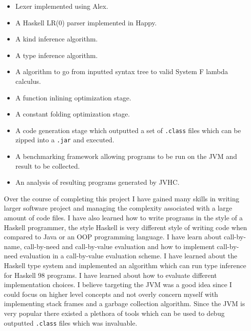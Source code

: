 \documentclass[float=false, crop=false]{standalone}
\begin{document}
\begin{itemize}

  \item Lexer implemented using Alex.

  \item A Haskell LR(0) parser implemented in Happy.

  \item A kind inference algorithm.

  \item A type inference algorithm.

  \item A algorithm to go from inputted syntax tree to valid
    System F lambda calculus.

  \item A function inlining optimization stage.

  \item A constant folding optimization stage.

  \item A code generation stage which outputted a set of \verb|.class|
    files which can be zipped into a \verb|.jar| and executed.

  \item A benchmarking framework allowing programs to be run on the JVM and 
    result to be collected.

  \item An analysis of resulting programs generated by JVHC.
\end{itemize}
Over the course of completing this project I have gained many
skills in writing larger software project and managing the complexity associated with
a large amount of code files. I have also learned how to write programs in the 
style of a Haskell programmer, the style Haskell is 
very different style of writing code when compared to Java or an OOP
programming language. I have learn about call-by-name, call-by-need and 
call-by-value evaluation and how to implement call-by-need evaluation
in a call-by-value evaluation scheme. I have learned about the Haskell
type system and implemented an algorithm which can run type inference
for Haskell 98 programs. I have learned about how to evaluate different implementation
choices. I believe targeting the JVM was a good idea since I could focus
on higher level concepts and not overly concern myself with 
implementing stack frames and a garbage collection algorithm. 
Since the JVM is very popular there existed a plethora of tools which can be 
used to debug outputted \verb|.class| files which was invaluable. 
\end{document}
